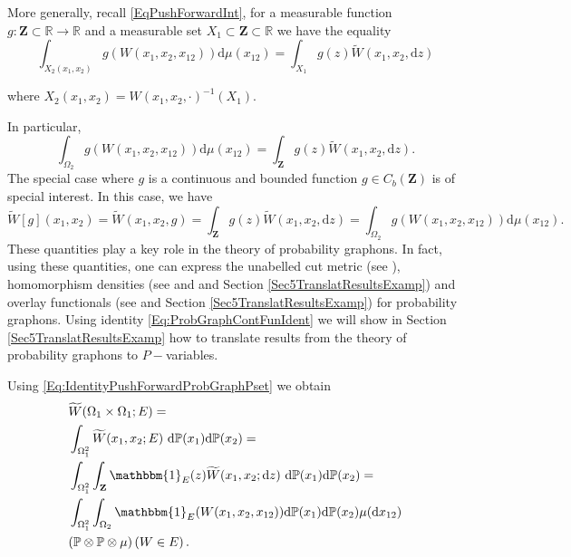 \documentclass[11pt]{article}
\def\R{\mathbb{R}}
\newcommand{\Space}{\mathbf{Z}}
\newcommand{\CbFunct}{C_b(\Space)}
\newcommand{\drv}{\mathrm{d}}
\begin{document}
More generally, recall \eqref{EqPushForwardInt}, for a measurable function $g:\Space \subset\R \rightarrow \R$ and a measurable set $X_1\subset \Space \subset \R$ we have the equality 
\begin{equation}\label{Eq:IdentityPushForwardProbGraphPset}
    \int_{X_2(x_1,x_2)}g(W(x_1,x_2,x_{12}))\mathrm{d}\mu(x_{12})=\int_{X_1}g(z)\widetilde W(x_1,x_2,\mathrm{d}z)
\end{equation}

where $X_2(x_1,x_2)=W(x_1,x_2,\cdot)^{-1}(X_1).$

In particular, 
$$
\int_{\Omega_2}g(W(x_1,x_2,x_{12}))\mathrm{d}\mu(x_{12})=\int_{\Space}g(z)\widetilde W(x_1,x_2,\mathrm{d}z).
$$
The special case where $g$ is a continuous and bounded function $g\in \CbFunct$ is of special interest. In this case, we have
\begin{equation}\label{Eq:ProbGraphContFunIdent}
    \widetilde W[g](x_1,x_2)=\widetilde W(x_1,x_2,g)=\int_{\Space}g(z)\widetilde W(x_1,x_2,\mathrm{d}z)=\int_{\Omega_2}g(W(x_1,x_2,x_{12}))\mathrm{d}\mu(x_{12}).
\end{equation}
These quantities play a key role in the theory of probability graphons. In fact, using these quantities, one can express the unabelled cut metric (see \cite{abraham2023probabilitygraphons,zucal2024probabilitygraphonsrightconvergence}), homomorphism densities (see \cite{abraham2023probabilitygraphons} and and Section \ref{Sec5TranslatResultsExamp}) and overlay functionals (see \cite{zucal2024probabilitygraphonsrightconvergence} and Section \ref{Sec5TranslatResultsExamp}) for probability graphons. Using identity \eqref{Eq:ProbGraphContFunIdent} we will show in Section \ref{Sec5TranslatResultsExamp} how to translate results from the theory of probability graphons to $P-$variables.

Using \eqref{Eq:IdentityPushForwardProbGraphPset} we obtain 
\begin{equation*}
\begin{aligned}
 &   \widetilde  W  (\Omega_1\times \Omega_1; E)=\\
&\int_{\Omega_1^2}  \widetilde W(x_1,x_2;E) \ \mathrm{d} \mathbb{P}(x_1)\mathrm{d} \mathbb{P}(x_2)  =\\
&\int_{\Omega_1^2}\int_{\Space}\mathbbm{1}_{E}(z)  \widetilde W(x_1,x_2;\drv z) \ \mathrm{d} \mathbb{P}(x_1)\mathrm{d} \mathbb{P}(x_2) =\\
&\int_{\Omega_1^2}\int_{\Omega_2}\mathbbm{1}_{E}(W(x_1,x_2,x_{12}))\mathrm{d} \mathbb{P}(x_1)\mathrm{d} \mathbb{P}(x_2) \mu ( \drv x_{12})\\
&(\mathbb{P}\otimes \mathbb{P}\otimes \mu)\left(W\in E\right).
\end{aligned}
\end{equation*}
\end{document}
